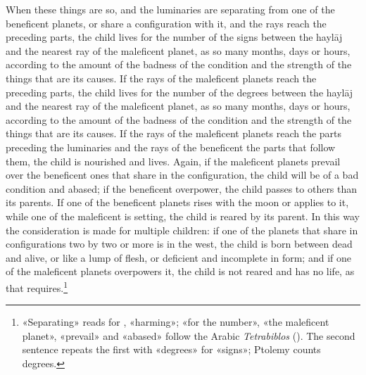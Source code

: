 \documentclass[11pt]{article}
\newcommand{\Fol}[1]{\marginpar{\footnotesize\color{gray}f.\,#1}}
\begin{document}
\par \Fol{44r}When these things are so, and the luminaries are separating from one of the beneficent planets, or share a configuration with it, and the rays reach the preceding parts, the child lives for the number of the signs between the haylāj and the nearest ray of the maleficent planet, as so many months, days or hours, according to the amount of the badness of the condition and the strength of the things that are its causes. If the rays of the maleficent planets reach the preceding parts, the child lives for the number of the degrees between the haylāj and the nearest ray of the maleficent planet, as so many months, days or hours, according to the amount of the badness of the condition and the strength of the things that are its causes. If the rays of the maleficent planets reach the parts preceding the luminaries and the rays of the beneficent the parts that follow them, the child is nourished and lives. Again, if the maleficent planets prevail over the beneficent ones that share in the configuration, the child will be of a bad condition and abased; if the beneficent overpower, the child passes to others than its parents. If one of the beneficent planets rises with the moon or applies to it, while one of the maleficent is setting, the child is reared by its parent. In this way the consideration is made for multiple children: if one of the planets that share in configurations two by two or more is in the west, the child is born between dead and alive, or like a lump of flesh, or deficient and incomplete in form; and if one of the maleficent planets overpowers it, the child is not reared and has no life, as that requires.\footnote{«Separating» reads  for , «harming»; «for the number», «the maleficent planet», «prevail» and «abased» follow the Arabic \emph{Tetrabiblos} (). The second sentence repeats the first with «degrees» for «signs»; Ptolemy counts degrees.}\par
\end{document}
